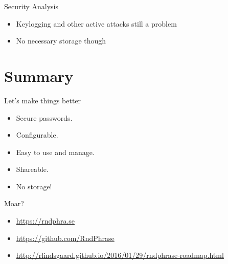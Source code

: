 \documentclass{beamer}
\begin{document}
\begin{frame}{Security Analysis}
  \begin{itemize}
    \item Keylogging and other active attacks still a problem
    \item No necessary storage though
  \end{itemize}
\end{frame}


\section{Summary}
\begin{frame}{Let's make things better}
  \begin{itemize}
    \item Secure passwords.
    \item Configurable.
    \item Easy to use and manage.
    \item Shareable.
    \item {\color{red} No storage!}
  \end{itemize}
\end{frame}

\begin{frame}{Moar?}
  \begin{itemize}
    \item \url{https://rndphra.se}
    \item \url{https://github.com/RndPhrase}
    \item \url{http://rlindsgaard.github.io/2016/01/29/rndphrase-roadmap.html}
  \end{itemize}
\end{frame}
\end{document}
